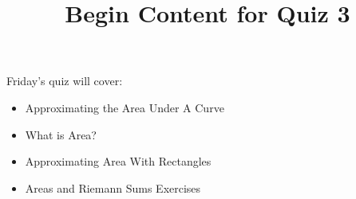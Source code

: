 \documentclass{ximera}
\title{Begin Content for Quiz 3}
\begin{document}
\begin{abstract}
\end{abstract}

\maketitle

\begin{sectionOutcomes}

Friday's quiz will cover:




\begin{itemize}
\item Approximating the Area Under A Curve
\item What is Area?
\item Approximating Area With Rectangles
\item Areas and Riemann Sums Exercises
\end{itemize}

\end{sectionOutcomes}
\end{document}
